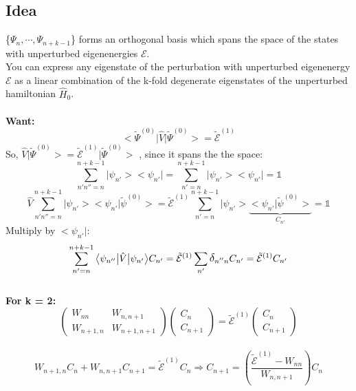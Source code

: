 \documentclass[12pt,fancychapters]{report}
\numberwithin{equation}{section}
\begin{document}
\subsection*{Idea}
\{$\Psi_n, \cdots, \Psi_{n+k-1} $\} forms an orthogonal basis which spans the space of the states 
with unperturbed eigenenergies $\mathcal{E}$.\\
You can express any eigenstate of the perturbation with unperturbed eigenenergy $\mathcal{E}$
as a linear combination of the k-fold degenerate eigenstates of the unperturbed hamiltonian 
$\hat{H}_0$. \\
\\
\textbf{Want:}
\[
  \big<\tilde{\Psi}^{(0)}\big|\hat{V}\big|\tilde{\Psi}^{(0)}\big> = \tilde{\mathcal{E}}^{(1)}
\]
So, $\hat{V}\big|\tilde{\Psi}^{(0)}\big> = \tilde{\mathcal{E}}^{(1)}\big|\tilde{\Psi}^{(0)}\big>$
, since it spans the the space:
\[
  \sum_{n'n''=n}^{n+k-1}\big|\psi_{n'}\big>\big<\psi_{n'}\big| =
  \sum_{n'=n}^{n+k-1}\big|\psi_{n'}\big>\big<\psi_{n'}\big| = \mathbb{1}
\]
\[
  \hat{V}\sum_{n'n''=n}^{n+k-1}\big|\psi_{n'}\big>\big<\psi_{n'}\big|\tilde{\psi}^{(0)}\big> =
  \tilde{\mathcal{E}}^{(1)} \sum_{n'=n}^{n+k-1}\big|\psi_{n'}\big>\underbrace{\big<\psi_{n'}
  \big|\tilde{\psi}^{(0)}\big>}_{C_{n'}} = 
  \mathbb{1} 
\]
Multiply by $\big<\psi_{n'}\big|$:
\[
  \sum_{n'=n}^{n+k-1} \big<\psi_{n''}\big|\hat{V}\big|\psi_{n'}\big>C_{n'} = 
  \tilde{\mathcal{E}}^{(1)}\sum_{n'}\mathlarger{\delta}_{n''n}C_{n'} = \tilde{\mathcal{E}}^{(1)}
  C_{n'}
\]
\\
\textbf{For k = 2:}
\\
\begin{equation}
  \begin{pmatrix}
  W_{nn} & W_{n,n+1}\\
  W_{n+1, n} & W_{n+1, n+1}
  \end{pmatrix}
  \begin{pmatrix}
  C_n\\
  C_{n+1}
\end{pmatrix}= \tilde{\mathcal{E}}^{(1)}
\begin{pmatrix}
  C_{n}\\
  C_{n+1}
\end{pmatrix}
\end{equation}
\\
\begin{equation}
  W_{n+1,n}C_{n}  + W_{n,n+1}C_{n+1} = \tilde{\mathcal{E}}^{(1)}C_{n} \Longrightarrow C_{n+1} =
  \left(\frac{\tilde{\mathcal{E}}^{(1)}-W_{nn}}{W_{n,n+1}}\right)C_n
\end{equation}
\end{document}
